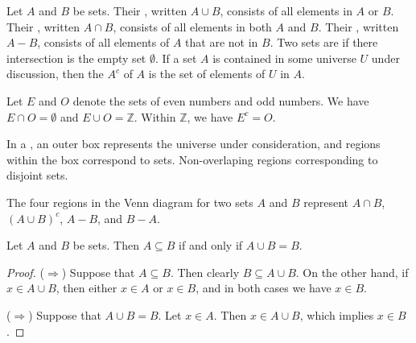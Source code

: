 \begin{defn}
Let $A$ and $B$ be sets.
Their , written $A\cup B$, consists of all elements in $A$ or $B$.
Their , written $A\cap B$, consists of all elements in both $A$ and $B$.
Their , written $A-B$, consists of all elements of $A$ that are not in $B$.
Two sets are  if there intersection is the empty set $\emptyset$.
If a set $A$ is contained in some universe $U$ under discussion,
then the  $A^c$ of $A$ is the set of elements of $U$  in $A$.
\end{defn}


\begin{eg}
Let $E$ and $O$ denote the sets of even numbers and odd numbers.
We have $E\cap O=\emptyset$ and $E\cup O = \mathbb{Z}$.
Within $\mathbb{Z}$, we have $E^c=O$.
\end{eg}


\begin{defn}
In a , an outer box represents the universe under consideration,
and regions within the box correspond to sets.
Non-overlaping regions corresponding to disjoint sets.
\end{defn}


\begin{eg}
The four regions in the Venn diagram for two sets $A$ and $B$ represent $A\cap B$,
$(A\cup B)^c$, $A-B$, and $B-A$.
\end{eg}


\begin{prop}
Let $A$ and $B$ be sets.
Then $A\subseteq B$ if and only if $A\cup B = B$.
\end{prop}
\begin{proof}
($\Rightarrow$) Suppose that $A\subseteq B$.
Then clearly $B\subseteq A\cup B$.
On the other hand, if $x\in A\cup B$, then either $x\in A$ or $x\in B$,
and in both cases we have $x\in B$.

($\Rightarrow$)
Suppose that $A\cup B = B$.
Let $x\in A$.
Then $x\in A\cup B$, which implies $x\in B$.
\end{proof}


